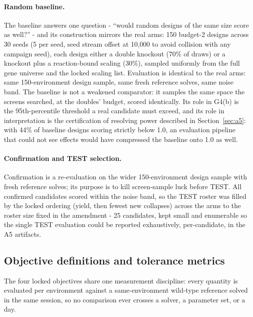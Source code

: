 \documentclass[12pt]{article}
\begin{document}
\paragraph{Random baseline.} The baseline answers one question -
``would random designs of the same size score as well?'' - and its
construction mirrors the real arms: 150 budget-2 designs across 30
seeds (5 per seed, seed stream offset at 10{,}000 to avoid collision
with any campaign seed), each design either a double knockout (70\%
of draws) or a knockout plus a reaction-bound scaling (30\%), sampled
uniformly from the full gene universe and the locked scaling list.
Evaluation is identical to the real arms: same 150-environment design
sample, same fresh reference solves, same noise band. The baseline is
not a weakened comparator: it samples the same space the screens
searched, at the doubles' budget, scored identically. Its role in
G4(b) is the 95th-percentile threshold a real candidate must exceed,
and its role in interpretation is the certification of resolving
power described in Section~\ref{sec:a5}: with 44\% of baseline
designs scoring strictly below 1.0, an evaluation pipeline that could
not see effects would have compressed the baseline onto 1.0 as well.

\paragraph{Confirmation and TEST selection.} Confirmation is a
re-evaluation on the wider 150-environment design sample with fresh
reference solves; its purpose is to kill screen-sample luck before
TEST. All confirmed candidates scored within the noise band, so the
TEST roster was filled by the locked ordering (yield, then fewest new
collapses) across the arms to the roster size fixed in the amendment
- 25 candidates, kept small and enumerable so the single TEST
evaluation could be reported exhaustively, per-candidate, in the A5
artifacts.

\subsection{Objective definitions and tolerance metrics}
\label{sec:objectivedetail}

The four locked objectives share one measurement discipline: every
quantity is evaluated per environment against a same-environment
wild-type reference solved in the same session, so no comparison ever
crosses a solver, a parameter set, or a day.
\end{document}
